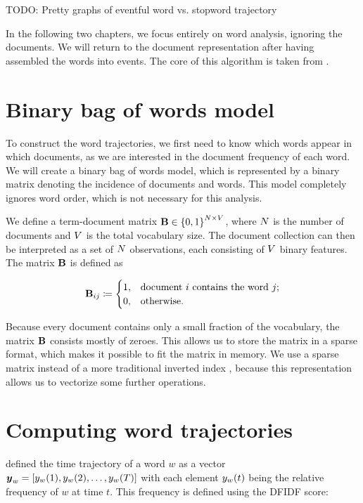 {\color{red} TODO: Pretty graphs of eventful word vs. stopword trajectory}

In the following two chapters, we focus entirely on word analysis, ignoring the documents. We will return to the document representation after having assembled the words into events. The core of this algorithm is taken from \cite{event-detection}.


\section{Binary bag of words model}
To construct the word trajectories, we first need to know which words appear in which documents, as we are interested in the document frequency of each word. We will create a binary bag of words model, which is represented by a binary matrix denoting the incidence of documents and words. This model completely ignores word order, which is not necessary for this analysis.

We define a term-document matrix $\mathbf{B} \in \left\{ 0, 1 \right\}^{N \times V}$, where $N$ is the number of documents and $V$ is the total vocabulary size. The document collection can then be interpreted as a set of $N$ observations, each consisting of $V$ binary features. The matrix $\mathbf{B}$ is defined as

\begin{equation} \label{eq:bow-matrix}
	\mathbf{B}_{ij} \coloneqq
	\begin{cases}
		1, & \text{document}~i~\text{contains the word}~j \text{;} \\
		0, & \text{otherwise.}
	\end{cases}
\end{equation}

Because every document contains only a small fraction of the vocabulary, the matrix $\mathbf{B}$ consists mostly of zeroes. This allows us to store the matrix in a sparse format, which makes it possible to fit the matrix in memory. We use a sparse matrix instead of a more traditional inverted index \cite{information-retrieval}, because this representation allows us to vectorize some further operations.


\section{Computing word trajectories}
\cite{event-detection} defined the time trajectory of a word $w$ as a vector\\ $\vect{\traj}_{w} = \left[ \traj_{w}(1), \traj_{w}(2), \dots, \traj_{w}(\streamlen) \right]$ with each element $y_{w}(t)$ being the relative frequency of $w$ at time $t$. This frequency is defined using the DFIDF score:

